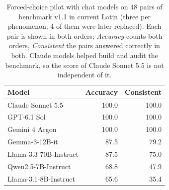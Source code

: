 \begin{table}[t]
\centering\small
\begin{tabular}{@{}lrr@{}}
\toprule
Model & Accuracy & Consistent \\
\midrule
Claude Sonnet 5.5 & 100.0 & 100.0 \\
GPT-6.1 Sol & 100.0 & 100.0 \\
Gemini 4 Argon & 100.0 & 100.0 \\
Gemma-3-12B-it & 87.5 & 79.2 \\
Llama-3.3-70B-Instruct & 87.5 & 75.0 \\
Qwen2.5-7B-Instruct & 68.8 & 47.9 \\
Llama-3.1-8B-Instruct & 65.6 & 35.4 \\
\bottomrule
\end{tabular}
\caption{Forced-choice pilot with chat models on 48 pairs of benchmark v1.1 in current Latin (three per phenomenon; 4 of them were later replaced). Each pair is shown in both orders; \emph{Accuracy} counts both orders, \emph{Consistent} the pairs answered correctly in both. Claude models helped build and audit the benchmark, so the score of Claude Sonnet 5.5 is not independent of it.}
\label{tab:pilot}
\end{table}
